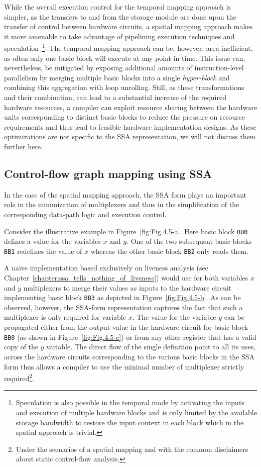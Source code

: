 While the overall execution control for the temporal mapping approach is simpler, as the transfers to and from the storage module are done upon the transfer of control between hardware circuits, a spatial mapping approach makes it more amenable to take advantage of pipelining execution techniques and speculation~\footnote{Speculation is also possible in the temporal mode by activating the inputs and execution of multiple hardware blocks and is only limited by the available storage bandwidth to restore the input context in each block which in the spatial approach is trivial.}. 
The temporal mapping approach can be, however, area-inefficient, as often only one basic block will execute at any point in time. 
This issue can, nevertheless, be mitigated by exposing additional amounts of instruction-level parallelism by merging multiple basic blocks into a single {\em hyper-block} and combining this aggregation with loop unrolling. 
Still, as these transformations and their combination, can lead to a substantial increase of the required hardware resources, a compiler can exploit resource sharing between the hardware units corresponding to distinct basic blocks to reduce the pressure on resource requirements and thus lead to feasible hardware implementation designs. 
As these optimizations are not specific to the SSA representation, we will not discuss them further here. 

\subsection{Control-flow graph mapping using SSA}
\label{sec:cfg_ssa_mapping}
In the case of the spatial mapping approach, the SSA form plays an important role in the minimization of multiplexers and thus in the simplification of the corresponding data-path logic and execution control.

Consider the illustrative example in Figure~\ref{fig:Fig.4.5-a}. 
Here basic block {\tt BB0} defines a value for the variables $x$ and $y$. 
One of the two subsequent basic blocks {\tt BB1} redefines the value of $x$ whereas the other basic block {\tt BB2} only reads them.

A naive implementation based exclusively on liveness analysis (see Chapter~\ref{chapter:ssa_tells_nothing_of_liveness}) would use for both variables $x$ and $y$ multiplexers to merge their values as inputs to the hardware circuit implementing basic block {\tt BB3} as depicted in Figure~\ref{fig:Fig.4.5-b}. 
As can be observed, however, the SSA-form representation captures the fact that such a multiplexer is only required for variable $x$. 
The value for the variable $y$ can be propagated either from the output value in the hardware circuit for basic block {\tt BB0} (as shown in Figure~\ref{fig:Fig.4.5-c}) or from any other register that has a valid copy of the $y$ variable. 
The direct flow of the single definition point to all its uses, across the hardware circuits corresponding to the various basic blocks in the SSA form thus allows a compiler to use the minimal number of multiplexer strictly required\footnote{Under the scenarios of a spatial mapping and with the common disclaimers about static control-flow analysis.}.


